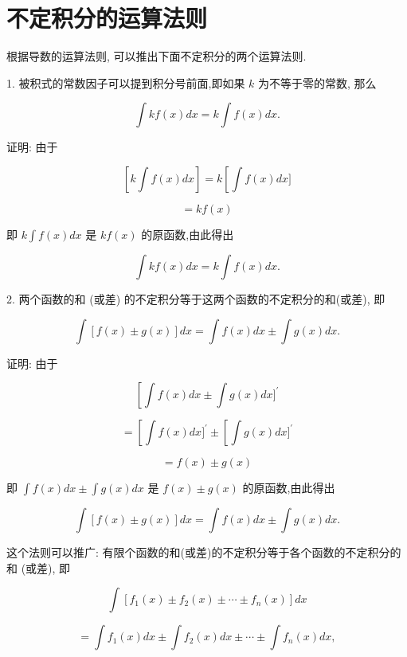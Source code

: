 \documentclass[lang=cn,newtx,10pt,scheme=chinese]{elegantbook}
\begin{document}
\section{不定积分的运算法则}

根据导数的运算法则, 可以推出下面不定积分的两个运算法则.

1. 被积式的常数因子可以提到积分号前面,即如果 \(k\) 为不等于零的常数, 那么

\[
\int {kf}\left( x\right) {dx} = k\int f\left( x\right) {dx}.
\]

证明: 由于

\[
\left\lbrack {k\int f\left( x\right) {dx}}\right\rbrack = k\left\lbrack {\int f\left( x\right) {dx}\rbrack }\right.
\]

\[
= {kf}\left( x\right)
\]

即 \(k\int f\left( x\right) {dx}\) 是 \({kf}\left( x\right)\) 的原函数,由此得出

\[
\int {kf}\left( x\right) {dx} = k\int f\left( x\right) {dx}.
\]

2. 两个函数的和 (或差) 的不定积分等于这两个函数的不定积分的和(或差), 即

\[
\int \left\lbrack {f\left( x\right) \pm g\left( x\right) }\right\rbrack {dx} = \int f\left( x\right) {dx} \pm \int g\left( x\right) {dx}.
\]

证明: 由于

\[
\left\lbrack {\int f\left( x\right) {dx} \pm \int g\left( x\right) {dx}{\rbrack }^{\prime }}\right.
\]

\[
= \left\lbrack {\int f\left( x\right) {dx}{\rbrack }^{\prime } \pm \left\lbrack {\int g\left( x\right) {dx}{\rbrack }^{\prime }}\right. }\right.
\]

\[
= f\left( x\right) \pm g\left( x\right)
\]

即 \(\int f\left( x\right) {dx} \pm \int g\left( x\right) {dx}\) 是 \(f\left( x\right) \pm g\left( x\right)\) 的原函数,由此得出

\[
\int \left\lbrack {f\left( x\right) \pm g\left( x\right) }\right\rbrack {dx} = \int f\left( x\right) {dx} \pm \int g\left( x\right) {dx}.
\]

这个法则可以推广: 有限个函数的和(或差)的不定积分等于各个函数的不定积分的和 (或差), 即

\[
\int \left\lbrack {{f}_{1}\left( x\right) \pm {f}_{2}\left( x\right) \pm \cdots \pm {f}_{n}\left( x\right) }\right\rbrack {dx}
\]

\[
= \int {f}_{1}\left( x\right) {dx} \pm \int {f}_{2}\left( x\right) {dx} \pm \cdots \pm \int {f}_{n}\left( x\right) {dx},
\]
\end{document}
